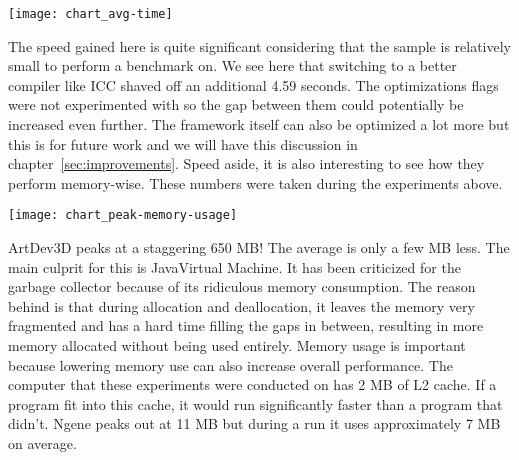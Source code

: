 \begin{center}\texttt{[image: chart\_avg-time]}\end{center}

The speed gained here is quite significant considering that the sample is relatively small to perform a benchmark on. We see here that switching to a better compiler like ICC shaved off an additional 4.59 seconds. The optimizations flags were not experimented with so the gap between them could potentially be increased even further. The framework itself can also be optimized a lot more but this is for future work and we will have this discussion in chapter~\ref{sec:improvements}. Speed aside, it is also interesting to see how they perform memory-wise. These numbers were taken during the experiments above.

\begin{center}\texttt{[image: chart\_peak-memory-usage]}\end{center}

ArtDev3D peaks at a staggering 650 MB! The average is only a few MB less. The main culprit for this is Java\texttrademark Virtual Machine. It has been criticized\cite{maio2008} for the garbage collector because of its ridiculous memory consumption. The reason behind is that during allocation and deallocation, it leaves the memory very fragmented and has a hard time filling the gaps in between, resulting in more memory allocated without being used entirely. Memory usage is important because lowering memory use can also increase overall performance. The computer that these experiments were conducted on has 2 MB of L2 cache. If a program fit into this cache, it would run significantly faster than a program that didn't. Ngene peaks out at 11 MB but during a run it uses approximately 7 MB on average.
